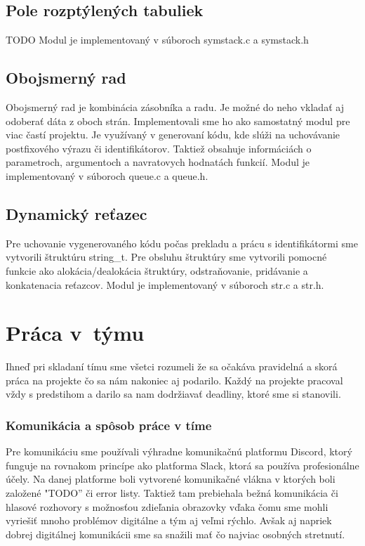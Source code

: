 \documentclass[a4paper, 11pt]{article}
\begin{document}
    \subsection{Pole rozptýlených tabuliek}
    TODO
    Modul je implementovaný v súboroch symstack.c a symstack.h

    \subsection{Obojsmerný rad}
    Obojsmerný rad je kombinácia zásobníka a radu. Je možné do neho vkladať aj odoberať dáta z oboch strán.
    Implementovali sme ho ako samostatný modul pre viac častí projektu.
    Je využívaný v generovaní kódu, kde slúži na uchovávanie postfixového výrazu či
    identifikátorov. Taktiež obsahuje informáciách o parametroch, argumentoch a navratovych hodnatách funkcií.
    Modul je implementovaný v súboroch queue.c a queue.h.


    \subsection{Dynamický reťazec}
    Pre uchovanie vygenerovaného kódu počas prekladu a prácu s identifikátormi sme vytvorili štruktúru string\_t.
    Pre obsluhu štruktúry sme vytvorili pomocné funkcie ako alokácia/dealokácia štruktúry,
    odstraňovanie, pridávanie a konkatenacia reťazcov.
    Modul je implementovaný v súboroch str.c a str.h.


    \section{Práca v~týmu}
    Ihneď pri skladaní tímu sme všetci rozumeli že sa
    očakáva pravidelná a skorá práca na projekte čo sa nám nakoniec aj podarilo.
    Každý na projekte pracoval vždy s predstihom a darilo sa nam dodržiavať deadliny,
    ktoré sme si stanovili.


    \subsubsection{Komunikácia a spôsob práce v tíme}
    Pre komunikáciu sme používali výhradne komunikačnú platformu Discord, ktorý funguje na
    rovnakom princípe ako platforma Slack, ktorá sa používa profesionálne účely.
    Na danej platforme boli vytvorené komunikačné vlákna
    v ktorých boli založené "TODO” či error listy. Taktiež tam prebiehala bežná komunikácia či hlasové rozhovory s
    možnosťou zdieľania obrazovky vďaka čomu sme mohli vyriešiť mnoho problémov
    digitálne a tým aj veľmi rýchlo. Avšak aj napriek
    dobrej digitálnej komunikácii sme sa snažili mať čo najviac
    osobných stretnutí.
\end{document}
